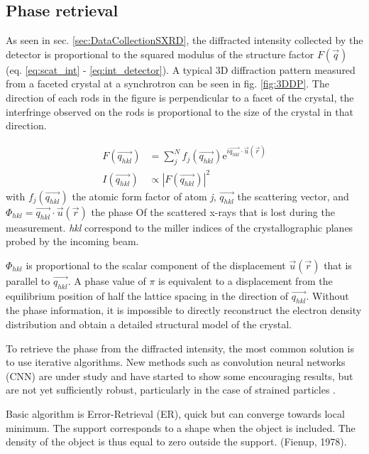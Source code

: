 \subsection{Phase retrieval}

As seen in sec. \ref{sec:DataCollectionSXRD}, the diffracted intensity collected by the detector is proportional to the squared modulus of the structure factor $F(\vec{q})$ (eq. \ref{eq:scat_int} - \ref{eq:int_detector}).
A typical 3D diffraction pattern measured from a faceted crystal at a synchrotron can be seen in fig. \ref{fig:3DDP}.
The direction of each rods in the figure is perpendicular to a facet of the crystal, the interfringe observed on the rods is proportional to the size of the crystal in that direction.

\begin{align}
    \label{eq:scat_int}
    F(\vec{q_{hkl}}) & = \sum_j^N f_j (\vec{q_{hkl}}) \mathrm{e}^{i\vec{q_{hkl}}\cdot\vec{u}(\vec{r})} \\
    \label{eq:int_detector}
    I(\vec{q_{hkl}}) & \propto |F(\vec{q_{hkl}})|^2
\end{align}
with $f_j (\vec{q_{hkl}})$ the atomic form factor of atom \textit{j}, $\vec{q_{hkl}}$ the scattering vector, and $\Phi_{hkl} = \vec{q_{hkl}}\cdot\vec{u}(\vec{r})$ the phase Of the scattered x-rays that is lost during the measurement.
\textit{hkl} correspond to the miller indices of the crystallographic planes probed by the incoming beam.

$\Phi_{hkl}$ is proportional to the scalar component of the displacement $\vec{u}(\vec{r})$ that is parallel to $ \vec{q_{hkl}}$.
A phase value of $\pi$ is equivalent to a displacement from the equilibrium position of half the lattice spacing in the direction of $\vec{q_{hkl}}$.
Without the phase information, it is impossible to directly reconstruct the electron density distribution and obtain a detailed structural model of the crystal.

To retrieve the phase from the diffracted intensity, the most common solution is to use iterative algorithms.
New methods such as convolution neural networks (CNN) are under study and have started to show some encouraging results, but are not yet sufficiently robust, particularly in the case of strained particles \cite{cherukara_real-time_2018,chan_rapid_2021,Wu2021}.

Basic algorithm is Error-Retrieval (ER), quick but can converge towards local minimum.
The support corresponds to a shape when the object is included. The density of the object is thus equal to zero outside the support. (Fienup, 1978).

